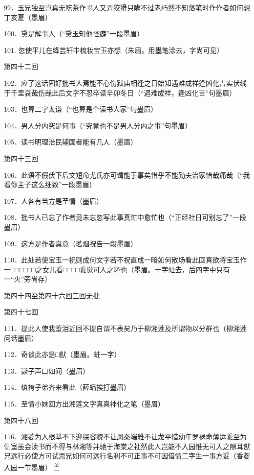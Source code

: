 99．玉兄独至岂真无吃茶作书人又弄狡猾只瞒不过老朽然不知落笔时作作者如何想丁亥夏{（\kaishu 墨眉）}

100．黛是解事人{（\kaishu ``黛玉知他怪癖''一段墨眉）}

101. 忽使平儿在绛芸轩中梳妆宝玉亦想{（\kaishu 朱眉。用墨笔涂去，字尚可见）}

第四十二回

102．应了这话固好批书人焉能不心伤狱庙相逢之日始知遇难成祥逢凶化吉实伏线于千里哀哉伤哉此后文字不忍卒读辛卯冬日{（\kaishu ``遇难成祥，逢凶化吉''句墨眉）}

103．也算二字太谦{（\kaishu ``也算是个读书人家''句墨眉）}

104．男人分内究是何事{（\kaishu ``究竟也不是男人分内之事''句墨眉）}

105．读书明理治民辅国者能有几人{（\kaishu 墨眉）}

第四十三回

106．此语不假伏下后文短命尤氏亦可谓能于事矣惜乎不能勤夫治家惜哉痛哉{（\kaishu ``我看你主子这么细致''一段墨眉）}

107．人各有当方是至情{（\kaishu 墨眉）}

108．批书人已忘了作者竟未忘忽写此事真忙中愈忙也{（\kaishu ``正经社日可别忘了''一段墨眉）}

109．这方是作者真意{（\kaishu 茗烟祝告一段墨眉）}

110．此处若使宝玉一祝则成何文字若不祝直成一暗如何散场看此回真欲将宝玉作一□□□□□□之女儿看□□□□乖觉可人之环也{（\kaishu 墨眉。十字蛀去，后四字中只有一``火''旁尚存）}

第四十四至第四十六回三回无批

第四十七回

111．提此人使我堕泪近回不提自谓不表矣乃于柳湘莲及所谓物以分群也{（\kaishu 柳湘莲问话墨眉）}

112．奇谈此亦是□獃{（\kaishu 墨眉。蛀一字）}

113．獃子声口如闻{（\kaishu 墨眉）}

114．纨袴子弟齐来看此{（\kaishu 薛蟠挨打墨眉）}

115．至情小妹回方出湘莲文字真真神化之笔{（\kaishu 墨眉）}

第四十八回

116．湘菱为人根基不下迎探容貌不让凤秦端雅不让龙平惜幼年罗祸命薄运乖至为侧室虽会读书而不得与林湘等并驰于海棠之社然此人岂能不入园惟无可入之隙耳獃兄远行必使方可试思兄如何可远行名利不可正事不可因借情二字生一事方妥{（\kaishu 香菱入园一节墨眉）}
\href{../Text/part0087.html\#lnkback_1_a}{\textsuperscript{①}}\href{../Text/part0087.html\#lnkback_t_a}{}

